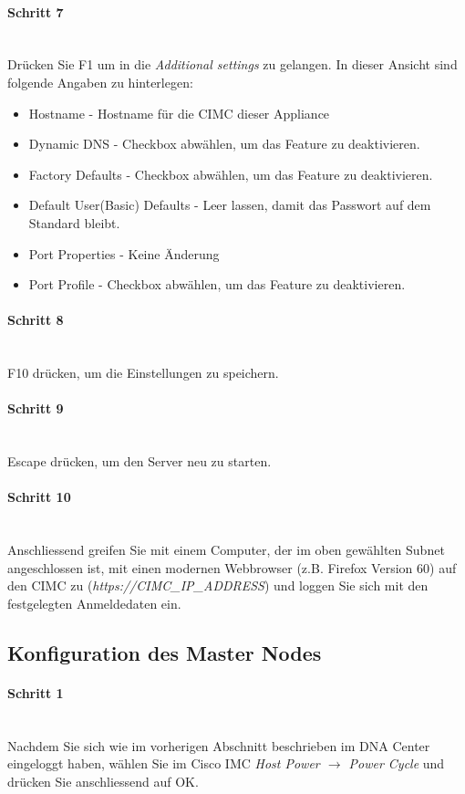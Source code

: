 \paragraph{Schritt 7}
~\\
Drücken Sie F1 um in die \textit{Additional settings} zu gelangen. In dieser Ansicht sind folgende Angaben zu hinterlegen:
\begin{itemize}
	\item Hostname - Hostname für die CIMC dieser Appliance
	\item Dynamic DNS - Checkbox abwählen, um das Feature zu deaktivieren.
	\item Factory Defaults - Checkbox abwählen, um das Feature zu deaktivieren.
	\item Default User(Basic) Defaults - Leer lassen, damit das Passwort auf dem Standard bleibt.
	\item Port Properties - Keine Änderung
	\item Port Profile - Checkbox abwählen, um das Feature zu deaktivieren. 
\end{itemize}

\paragraph{Schritt 8}
~\\
F10 drücken, um die Einstellungen zu speichern.

\paragraph{Schritt 9}
~\\
Escape drücken,  um den Server neu zu starten.

\paragraph{Schritt 10}
~\\
Anschliessend greifen Sie mit einem Computer, der im oben gewählten Subnet angeschlossen ist, mit einen modernen Webbrowser (z.B. Firefox Version 60) auf den CIMC zu (\textit{https://CIMC\_IP\_ADDRESS}) und loggen Sie sich mit den festgelegten Anmeldedaten ein. 

\subsection{Konfiguration des Master Nodes}
\paragraph{Schritt 1}
~\\
Nachdem Sie sich wie im vorherigen Abschnitt beschrieben im DNA Center eingeloggt haben, wählen Sie im Cisco IMC \textit{Host Power $\rightarrow$ Power Cycle} und drücken Sie anschliessend auf OK.

